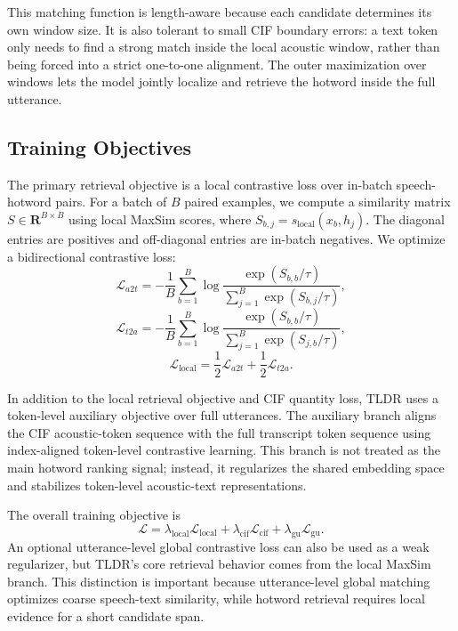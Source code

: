 \documentclass[letterpaper]{article} %
\begin{document}
This matching function is length-aware because each candidate determines its own window size. It is also tolerant to small CIF boundary errors: a text token only needs to find a strong match inside the local acoustic window, rather than being forced into a strict one-to-one alignment. The outer maximization over windows lets the model jointly localize and retrieve the hotword inside the full utterance.

\subsection{Training Objectives}

The primary retrieval objective is a local contrastive loss over in-batch speech-hotword pairs. For a batch of $B$ paired examples, we compute a similarity matrix $S \in \mathbf{R}^{B \times B}$ using local MaxSim scores, where $S_{b,j}=s_{\mathrm{local}}(x_b,h_j)$. The diagonal entries are positives and off-diagonal entries are in-batch negatives. We optimize a bidirectional contrastive loss:
\begin{equation}
	\mathcal{L}_{a2t}
	=-\frac{1}{B}\sum_{b=1}^{B}
	\log
	\frac{\exp(S_{b,b}/\tau)}
	{\sum_{j=1}^{B}\exp(S_{b,j}/\tau)},
\end{equation}
\begin{equation}
	\mathcal{L}_{t2a}
	=-\frac{1}{B}\sum_{b=1}^{B}
	\log
	\frac{\exp(S_{b,b}/\tau)}
	{\sum_{j=1}^{B}\exp(S_{j,b}/\tau)},
\end{equation}
\begin{equation}
	\mathcal{L}_{\mathrm{local}}
	=\frac{1}{2}\mathcal{L}_{a2t}
	+\frac{1}{2}\mathcal{L}_{t2a}.
\end{equation}

In addition to the local retrieval objective and CIF quantity loss, TLDR uses a token-level auxiliary objective over full utterances. The auxiliary branch aligns the CIF acoustic-token sequence with the full transcript token sequence using index-aligned token-level contrastive learning. This branch is not treated as the main hotword ranking signal; instead, it regularizes the shared embedding space and stabilizes token-level acoustic-text representations.

The overall training objective is
\begin{equation}
	\mathcal{L}
	= \lambda_{\mathrm{local}}\mathcal{L}_{\mathrm{local}}
	+ \lambda_{\mathrm{cif}}\mathcal{L}_{\mathrm{cif}}
	+ \lambda_{\mathrm{gu}}\mathcal{L}_{\mathrm{gu}}.
\end{equation}
An optional utterance-level global contrastive loss can also be used as a weak regularizer, but TLDR's core retrieval behavior comes from the local MaxSim branch. This distinction is important because utterance-level global matching optimizes coarse speech-text similarity, while hotword retrieval requires local evidence for a short candidate span.
\end{document}

